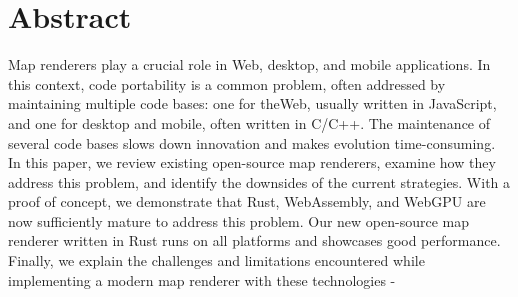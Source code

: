 
\chapter*{Abstract}
Map renderers play a crucial role in Web, desktop, and mobile applications. In this context, code portability is a common problem, often addressed by maintaining multiple code bases: one for theWeb, usually written in JavaScript, and one for desktop and mobile, often written in C/C++. The maintenance of several code bases slows down innovation and makes evolution time-consuming. In this paper, we review existing open-source map renderers, examine how they address this problem, and identify the downsides of the current strategies. With a proof of concept, we demonstrate that Rust, WebAssembly, and WebGPU are now sufficiently mature to address this problem. Our new open-source map renderer written in Rust runs on all platforms and showcases good performance. Finally, we explain the challenges and limitations encountered while implementing a modern map renderer with these technologies
-















